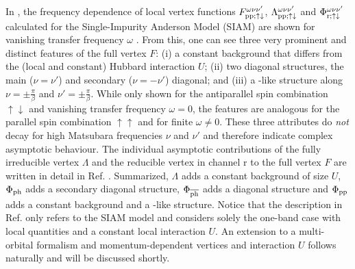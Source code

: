 \documentclass[../../main.tex]{subfiles}
\begin{document}
In , the frequency dependence of local vertex functions $F^{\omega\nu\nu'}_{\text{pp};\uparrow\downarrow}$, $\Lambda^{\omega\nu\nu'}_{\text{pp};\uparrow\downarrow}$ and $\Phi^{\omega\nu\nu'}_{\text{r};\uparrow\downarrow}$ calculated for the Single-Impurity Anderson Model (SIAM) are shown for vanishing transfer frequency $\omega$ \cite{high-freq asympt}. From this, one can see three very prominent and distinct features of the full vertex $F$: (i) a constant background that differs from the (local and constant) Hubbard interaction $U$; (ii) two diagonal structures, the main ($\nu=\nu'$) and secondary ($\nu=-\nu'$) diagonal; and (iii) a -like structure along $\nu=\pm\frac\pi\beta$ and $\nu'=\pm\frac\pi\beta$. While only shown for the antiparallel spin combination $\uparrow\downarrow$ and vanishing transfer frequency $\omega=0$, the features are analogous for the parallel spin combination $\uparrow\uparrow$ and for finite $\omega\neq0$. These three attributes do \textit{not} decay for high Matsubara frequencies $\nu$ and $\nu'$ and therefore indicate complex asymptotic behaviour. The individual asymptotic contributions of the fully irreducible vertex $\Lambda$ and the reducible vertex in channel r to the full vertex $F$ are written in detail in Ref. \cite{high-freq asympt}. Summarized, $\Lambda$ adds a constant background of size $U$, $\Phi_{\text{ph}}$ adds a secondary diagonal structure, $\Phi_{\overline{\text{ph}}}$ adds a diagonal structure and $\Phi_{\text{pp}}$ adds a constant background and a -like structure. Notice that the description in Ref. \cite{high-freq asympt} only refers to the SIAM model and considers solely the one-band case with local quantities and a constant local interaction $U$. An extension to a multi-orbital formalism and momentum-dependent vertices and interaction $U$ follows naturally and will be discussed shortly.
\end{document}
